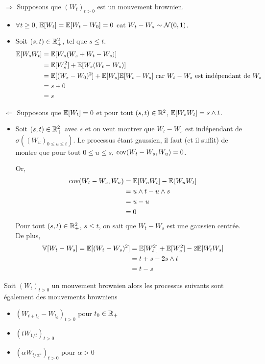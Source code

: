 \Preuve 
$\Rightarrow$ Supposons que $(W_t)_{t>0}$ est un mouvement brownien.
\begin{itemize}
  \item $\forall t\geq 0$, $\mathbb{E}[W_t] = \mathbb{E}[W_t-W_0] = 0$ cat $W_t-W_s \sim \mathcal{N}(0,1)$.
  \item Soit $(s,t) \in \mathbb{R}^2_+$, tel que $s\leq t$.
   \begin{equation*}
    \begin{split}
     \mathbb{E}[W_sW_t] &= \mathbb{E}[W_s(W_s+W_t-W_s)] \\
     &= \mathbb{E}[W_s^2] + \mathbb{E}[W_s(W_t-W_s)] \\
      &= \mathbb{E}[(W_s-W_0)^2] + \mathbb{E}[W_s]\mathbb{E}[W_t-W_s] \text{ car $W_t - W_s$ est indépendant de $W_s$} \\
      &= s + 0 \\
      &= s
    \end{split} 
   \end{equation*} 
\end{itemize}
$\Leftarrow$ Supposons que $\mathbb{E}[W_t] = 0$ et pour tout $(s,t) \in \mathbb{R}^2$, $\mathbb{E}[W_sW_t] = s \wedge t$. 
\begin{itemize}
  \item Soit $(s,t) \in \mathbb{R}^2_+$ avec $s$ et on veut montrer que $W_t -W_s$ est indépendant de $\sigma((W_u)_{0 \leq u \leq t})$. Le processus étant gaussien, il faut (et il suffit) de montre que pour tout $0 \leq u \leq s$, $\mathrm{cov}(W_t-W_s, W_u) = 0$.

Or,
\begin{equation*}
\begin{split}
  \mathrm{cov}(W_t-W_s,W_u) &= \mathbb{E}[W_uW_t] - \mathbb{E}(W_uW_t] \\
  &= u\wedge t - u\wedge s \\
  &= u - u \\
  &= 0
\end{split}
\end{equation*}
  Pour tout $(s,t) \in \mathbb{R}^2_+$, $s\leq t$, on sait que $W_t-W_s$ est une gaussien centrée. De plus,
    \begin{equation*}
    \begin{split}
      \mathbb{V}[W_t -W_s ] = \mathbb{E}[(W_t-W_s)^2] &= \mathbb{E}[W_t^2] + \mathbb{E}[W_s^2] - 2\mathbb{E}[W_tW_s] \\
      &= t + s - 2 s\wedge t \\
      &= t - s
    \end{split}
    \end{equation*}
\end{itemize}

\begin{cor}
  Soit $(W_t)_{t>0}$ un mouvement brownien alors les processus suivants sont également des mouvements browniens
  \begin{itemize}
    \item $(W_{t+t_0} - W_{t_0})_{t>0}$ pour $t_0 \in \mathbb{R}_+$
    \item $(tW_{1/t})_{t>0}$
    \item $(\alpha W_{t/\alpha^2})_{t>0}$ pour $\alpha > 0$
  \end{itemize}
\end{cor}


